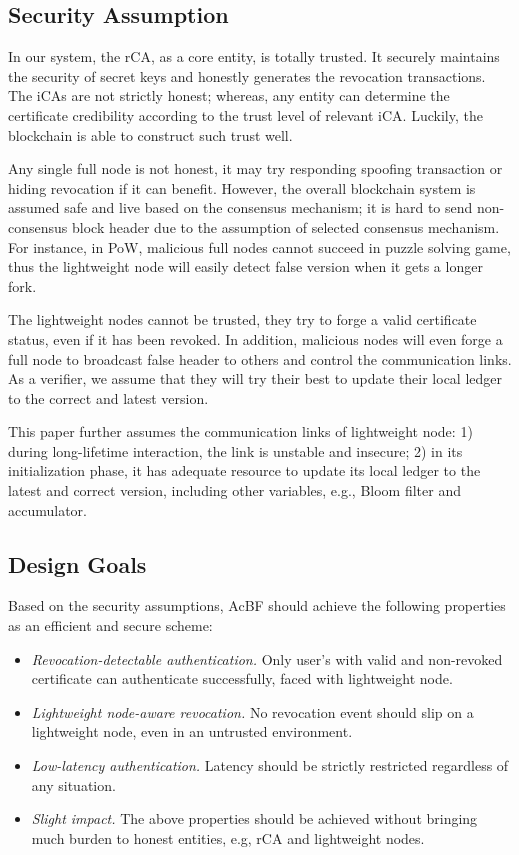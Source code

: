 \documentclass[conference]{IEEEtran}
\begin{document}
\subsection{Security Assumption}
In our system, the rCA, as a core entity, is totally trusted. It securely maintains the security of secret keys and honestly generates the revocation transactions. The iCAs are not strictly honest; whereas, any entity can determine the certificate credibility according to the trust level of relevant iCA. Luckily, the blockchain is able to construct such trust well. 

Any single full node is not honest, it may try responding spoofing transaction or hiding revocation if it can benefit. However, the overall blockchain system is assumed safe and live based on the consensus mechanism; it is hard to send non-consensus block header due to the assumption of selected consensus mechanism. For instance, in PoW, malicious full nodes cannot succeed in puzzle solving game, thus the lightweight node will easily detect false version when it gets a longer fork.

The lightweight nodes cannot be trusted, they try to forge a valid certificate status, even if it has been revoked. In addition, malicious nodes will even forge a full node to broadcast false header to others and control the communication links. As a verifier, we assume that they will try their best to update their local ledger to the correct and latest version. 

This paper further assumes the communication links of lightweight node: 1) during long-lifetime interaction, the link is unstable and insecure; 2) in its initialization phase, it has adequate resource to update its local ledger to the latest and correct version, including other variables, e.g., Bloom filter and accumulator.

\subsection{Design Goals}
Based on the security assumptions, AcBF should achieve the following properties as an efficient and secure scheme:  
\begin{itemize}
	\item \textit{Revocation-detectable authentication.} Only user's with valid and non-revoked certificate can authenticate successfully, faced with lightweight node.
	\item \textit{Lightweight node-aware revocation.} No revocation event should slip on a lightweight node, even in an untrusted environment. 
	\item \textit{Low-latency authentication.} Latency should be strictly restricted regardless of any situation. 
	\item \textit{Slight impact.} The above properties should be achieved without bringing much burden to honest entities, e.g, rCA and lightweight nodes.
\end{itemize}
\end{document}
